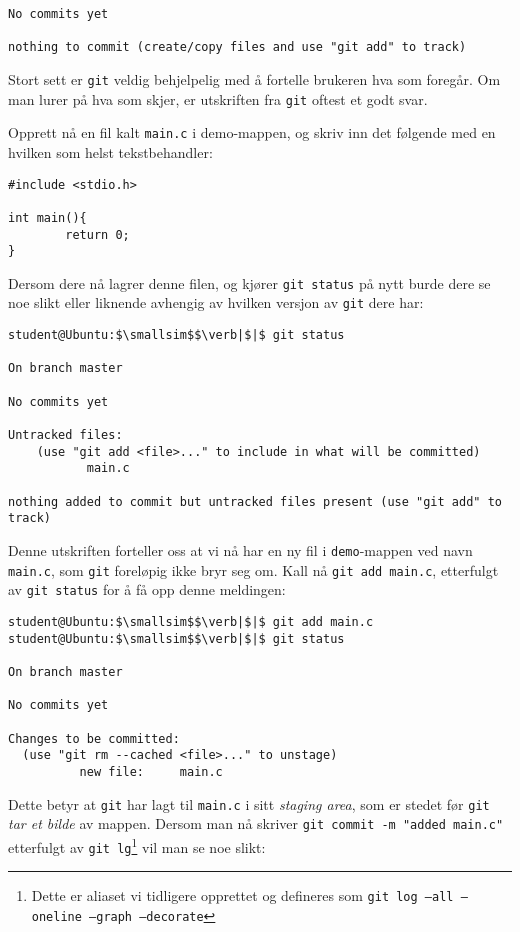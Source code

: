 \begin{alphasection}
\begin{lstlisting}[mathescape=true]
No commits yet

nothing to commit (create/copy files and use "git add" to track)
\end{lstlisting}


Stort sett er \verb|git| veldig behjelpelig med å fortelle brukeren hva som foregår. Om man lurer på hva som skjer, er utskriften fra \verb|git| oftest et godt svar.

Opprett nå en fil kalt \verb|main.c| i demo-mappen, og skriv inn det følgende med en hvilken som helst tekstbehandler:

\begin{lstlisting}
#include <stdio.h>

int main(){
        return 0;
}
\end{lstlisting}

Dersom dere nå lagrer denne filen, og kjører \verb|git status| på nytt burde dere se noe slikt eller liknende avhengig av hvilken versjon av \verb|git| dere har:

\begin{lstlisting}[mathescape=true]
student@Ubuntu:$\smallsim$$\verb|$|$ git status

On branch master

No commits yet

Untracked files:
    (use "git add <file>..." to include in what will be committed)
           main.c

nothing added to commit but untracked files present (use "git add" to track)
\end{lstlisting}

Denne utskriften forteller oss at vi nå har en ny fil i \verb|demo|-mappen ved navn \verb|main.c|, som \verb|git| foreløpig ikke bryr seg om. Kall nå \verb|git add main.c|, etterfulgt av \verb|git status| for å få opp denne meldingen:

\begin{lstlisting}[mathescape=true]
student@Ubuntu:$\smallsim$$\verb|$|$ git add main.c
student@Ubuntu:$\smallsim$$\verb|$|$ git status

On branch master

No commits yet

Changes to be committed:
  (use "git rm --cached <file>..." to unstage)
	      new file:     main.c
\end{lstlisting}

Dette betyr at \verb|git| har lagt til \verb|main.c| i sitt \textit{staging area}, som er stedet før \verb|git| \textit{tar et bilde} av mappen. Dersom man nå skriver \verb|git commit -m "added main.c"| etterfulgt av \verb|git lg|\footnote{Dette er aliaset vi tidligere opprettet og defineres som \texttt{git log --all --oneline --graph --decorate}} vil man se noe slikt:


\end{alphasection}
